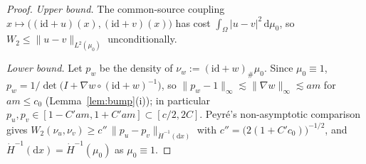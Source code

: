 \documentclass[11pt]{article}
\theoremstyle{definition}
\theoremstyle{remark}
\begin{document}
\begin{proof}
\emph{Upper bound.} The common-source coupling $x\mapsto\big((\mathrm{id}+u)(x),(\mathrm{id}+v)(x)\big)$
has cost $\int_\Omega|u-v|^2\,\mathrm d\mu_0$, so $W_2\le\|u-v\|_{L^2(\mu_0)}$ unconditionally.

\emph{Lower bound.} Let $p_w$ be the density of $\nu_w:=(\mathrm{id}+w)_\#\mu_0$. Since $\mu_0\equiv1$,
$p_w=1/\det\!\big(I+\nabla w\circ(\mathrm{id}+w)^{-1}\big)$, so $\|p_w-1\|_\infty\lesssim\|\nabla w\|_\infty\lesssim am$
for $am\le c_0$ (Lemma~\ref{lem:bump}(i)); in particular $p_u,p_v\in[1-C'am,1+C'am]\subset[c/2,2C]$.
Peyr\'e's non-asymptotic comparison \cite[Thm.~1]{peyre} gives
$W_2(\nu_u,\nu_v)\ge c''\,\|p_u-p_v\|_{\dot H^{-1}(\mathrm dx)}$ with $c''=\big(2(1+C'c_0)\big)^{-1/2}$,
and $\dot H^{-1}(\mathrm dx)=\dot H^{-1}(\mu_0)$ as $\mu_0\equiv1$.


\end{proof}
\end{document}
